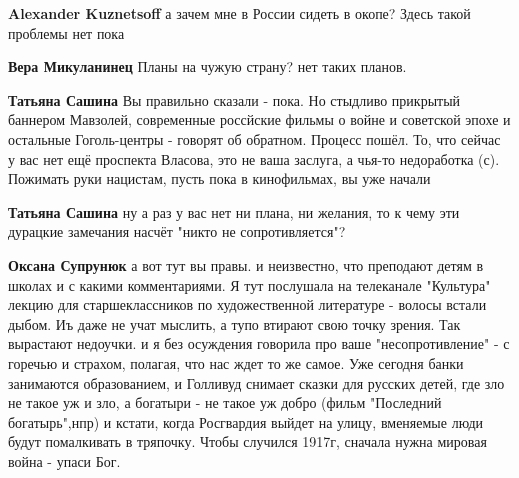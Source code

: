 \begin{itemize}
\begin{itemize}
\textbf{Alexander Kuznetsoff} а зачем мне в России сидеть в окопе? Здесь такой проблемы нет пока

 
\textbf{Вера Микуланинец} Планы на чужую страну? нет таких планов.

 
\textbf{Татьяна Сашина} Вы правильно сказали - пока. Но стыдливо прикрытый
баннером Мавзолей, современные россйские фильмы о войне и советской эпохе и
остальные Гоголь-центры - говорят об обратном. Процесс пошёл. То, что сейчас у
вас нет ещё проспекта Власова, это не ваша заслуга, а чья-то недоработка (с).
Пожимать руки нацистам, пусть пока в кинофильмах, вы уже начали

 
\textbf{Татьяна Сашина} ну а раз у вас нет ни плана, ни желания, то к чему эти дурацкие замечания насчёт "никто не сопротивляется"?

 
\textbf{Оксана Супрунюк} а вот тут вы правы. и неизвестно, что преподают детям
в школах и с какими комментариями. Я тут послушала на телеканале "Культура"
лекцию для старшеклассников по художественной литературе - волосы встали дыбом.
Иъ даже не учат мыслить, а тупо втирают свою точку зрения. Так вырастают
недоучки. и я без осуждения говорила про ваше "несопротивление" - с горечью и
страхом, полагая, что нас ждет то же самое. Уже сегодня банки занимаются
образованием, и Голливуд снимает сказки для русских детей, где зло не такое уж
и зло, а богатыри - не такое уж добро (фильм "Последний богатырь",нпр) и
кстати, когда Росгвардия выйдет на улицу, вменяемые люди будут помалкивать в
тряпочку. Чтобы случился 1917г, сначала нужна мировая война - упаси Бог.


\end{itemize}
\end{itemize}
